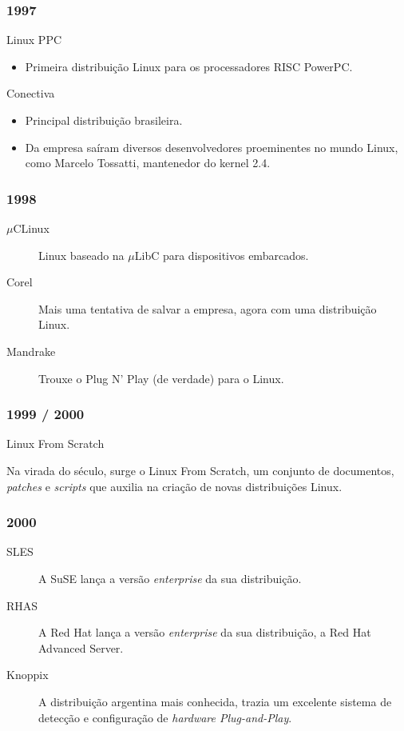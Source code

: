 \documentclass[aspectratio=169,14pt]{beamer}
\begin{document}
\begin{frame}
    \frametitle{1997}
    \begin{center}\large Linux PPC \end{center}
    \begin{itemize}
        \item Primeira distribuição Linux para os processadores RISC PowerPC.
    \end{itemize}
    \begin{center}\large Conectiva\end{center}
    \begin{itemize}
        \item Principal distribuição brasileira.
        \item Da empresa saíram diversos desenvolvedores proeminentes no
        mundo Linux, como Marcelo Tossatti, mantenedor do kernel 2.4.
    \end{itemize}
\end{frame}

\begin{frame}
    \frametitle{1998}
    \begin{description}
        \item[$\mu$CLinux] Linux baseado na $\mu$LibC para dispositivos embarcados.
        \item[Corel] Mais uma tentativa de salvar a empresa, agora com uma distribuição Linux.
        \item[Mandrake] Trouxe o Plug N' Play (de verdade) para o Linux.
    \end{description}
\end{frame}

\begin{frame}
    \frametitle{1999 / 2000}
    \begin{center}\large Linux From Scratch \end{center}
    Na virada do século, surge o Linux From Scratch, um conjunto de documentos,
    \emph{patches} e \emph{scripts} que auxilia na criação de novas distribuições
    Linux.
\end{frame}

\begin{frame}
    \frametitle{2000}
    \begin{description}
        \item[SLES] A SuSE lança a versão \emph{enterprise} da sua distribuição.
        \item[RHAS] A Red Hat lança a versão \emph{enterprise} da sua
        distribuição, a Red Hat Advanced Server.
        \item[Knoppix] A distribuição argentina mais conhecida, trazia um
        excelente sistema de detecção e configuração de \emph{hardware Plug-and-Play}.
    \end{description}
\end{frame}
\end{document}
